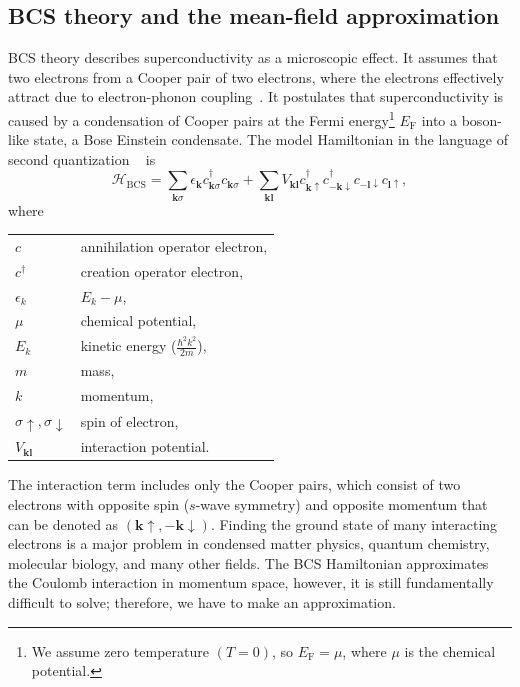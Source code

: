 \subsection{BCS theory and the mean-field approximation}\label{sec:BCS-theory}
BCS theory describes superconductivity as a microscopic effect.
It assumes that two electrons from a Cooper pair of two electrons, where the electrons effectively attract due to electron-phonon coupling~\cite{Cooper1956,Bardeen1957,Bardeen1957a}.
It postulates that superconductivity is caused by a condensation of Cooper pairs at the Fermi energy\footnote{We assume zero temperature $\left(T=0\right)$, so $E_{\textrm{F}}=\mu$, where $\mu$ is the chemical potential.} $E_{\textrm{F}}$ into a boson-like state, a Bose Einstein condensate.  %
The model Hamiltonian in the language of second quantization ~\cite{Gennes1999} is
\begin{equation}
\mathcal{H}_{\textrm{BCS}}=\sum_{\bm{k}\sigma}\epsilon_{\bm{k}}c_{\bm{k}\sigma}^{\dagger}c_{\bm{k}\sigma}+\sum_{\bm{k}\bm{l}}V_{\bm{k}\bm{l}}c_{\bm{k}\uparrow}^{\dagger}c_{-\bm{k}\downarrow}^{\dagger}c_{-\bm{l}\downarrow}c_{\bm{l}\uparrow},\label{eq:BCS}
\end{equation}
where
\begin{tabular}{ll}
$c$            & annihilation operator electron,\tabularnewline
$c^{\dagger}$  & creation operator electron,\tabularnewline
$\epsilon_{k}$ & $E_{k}-\mu$,\tabularnewline
$\mu$          & chemical potential,\tabularnewline
$E_{k}$        & kinetic energy ($\frac{\hbar^{2}k^{2}}{2m}$),\tabularnewline
$m$            & mass,\tabularnewline
$k$            & momentum,\tabularnewline
$\sigma\uparrow,\sigma\downarrow$ & spin of electron,\tabularnewline
$V_{\bm{kl}}$  & interaction potential.\tabularnewline
\end{tabular}
The interaction term includes only the Cooper pairs, which consist of two electrons with opposite spin ($s$-wave symmetry) and opposite momentum that can be denoted as $(\bm{\bm{k}}\uparrow,-\bm{k}\downarrow)$.
Finding the ground state of many interacting electrons is a major problem in condensed matter physics, quantum chemistry, molecular biology, and many other fields.
The BCS Hamiltonian approximates the Coulomb interaction in momentum space, however, it is still fundamentally difficult to solve; therefore, we have to make an approximation.

